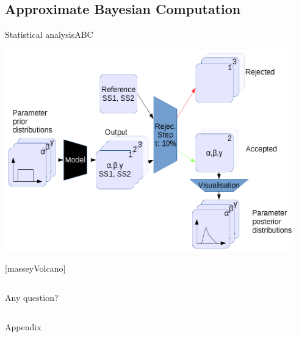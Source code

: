 \documentclass[10pt,aspectratio=43]{beamer}
\begin{document}
\subsection{Approximate Bayesian Computation}
\begin{frame}{Statistical analysis}{ABC}
\begin{center}
  \includegraphics[width=0.94\textwidth]{../data/abc-landscape.png}
\end{center}
\end{frame}


[masseyVolcano]
\begin{frame}[plain]
\begin{columns}
    \tableofcontents[subsectionstyle=hide]

    Any question?

\end{columns}
\end{frame}


\begin{frame}[noframenumbering]
Appendix
\end{frame}
\end{document}
